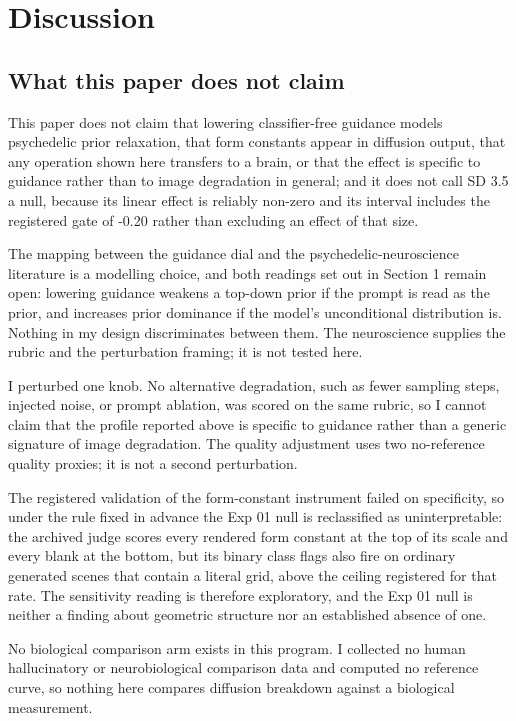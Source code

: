 \documentclass[11pt]{article}
\begin{document}
\section{Discussion}\label{discussion}

\subsection{What this paper does not
claim}\label{what-this-paper-does-not-claim}

This paper does not claim that lowering classifier-free guidance models
psychedelic prior relaxation, that form constants appear in diffusion output,
that any operation shown here transfers to a brain, or that the effect is
specific to guidance rather than to image degradation in general; and it does
not call SD 3.5 a null, because its linear effect is reliably non-zero and its
interval includes the registered gate of -0.20 rather than excluding an effect
of that size.

The mapping between the guidance dial and the psychedelic-neuroscience
literature is a modelling choice, and both readings set out in Section 1 remain
open: lowering guidance weakens a top-down prior if the prompt is read as the
prior, and increases prior dominance if the model's unconditional distribution
is. Nothing in my design discriminates between them. The neuroscience supplies
the rubric and the perturbation framing; it is not tested here.

I perturbed one knob. No alternative degradation, such as fewer sampling steps,
injected noise, or prompt ablation, was scored on the same rubric, so I cannot
claim that the profile reported above is specific to guidance rather than a
generic signature of image degradation. The quality adjustment uses two
no-reference quality proxies; it is not a second perturbation.

The registered validation of the form-constant instrument failed on specificity,
so under the rule fixed in advance the Exp 01 null is reclassified as
uninterpretable: the archived judge scores every rendered form constant at the
top of its scale and every blank at the bottom, but its binary class flags also
fire on ordinary generated scenes that contain a literal grid, above the ceiling
registered for that rate. The sensitivity reading is therefore exploratory, and
the Exp 01 null is neither a finding about geometric structure nor an
established absence of one.

No biological comparison arm exists in this program. I collected no human
hallucinatory or neurobiological comparison data and computed no reference
curve, so nothing here compares diffusion breakdown against a biological
measurement.
\end{document}
